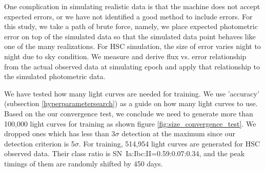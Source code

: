 \documentclass[useamsfonts]{pasj01}
\begin{document}
One complication in simulating realistic data is that the machine does not accept expected errors, or we have not identified a good method to include errors.   
For this study, we take a path of brute force, namely, we place expected photometric error on top of the simulated data so that the simulated data point behaves like one of the many realizations.
For HSC simulation, the size of error varies night to night due to sky condition. 
We measure and derive flux vs. error relationship from the actual observed data at simulating epoch and apply that relationship to the simulated photometric data.

We have tested how many light curves are needed for training.  We use 'accuracy' (subsection \ref{hyperparametersearch}) as a guide on how many light curves to use.  
Based on the our convergence test, we conclude we need to generate more than 100,000 light curves for training as shown figure \ref{fig:size_convergence_test}.
We dropped ones which has less than 3$\sigma$ detection at the maximum since our detection criterion is 5$\sigma$. %
For training, 514,954 light curves are generated for HSC observed data. 
Their class ratio is SN~Ia:Ibc:II=0.59:0.07:0.34, and the peak timings of them are randomly shifted by 450 days.
%
%
\end{document}
